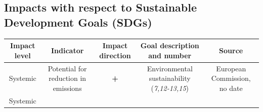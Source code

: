 \documentclass[
]{book}
\begin{document}
\hypertarget{impacts-with-respect-to-sustainable-development-goals-sdgs-22}{%
\subsection*{Impacts with respect to Sustainable Development Goals (SDGs)}\label{impacts-with-respect-to-sustainable-development-goals-sdgs-22}}

\begin{longtable}[]{@{}ccccc@{}}
\toprule
\begin{minipage}[b]{0.17\columnwidth}\centering
Impact level\strut
\end{minipage} & \begin{minipage}[b]{0.16\columnwidth}\centering
Indicator\strut
\end{minipage} & \begin{minipage}[b]{0.17\columnwidth}\centering
Impact direction\strut
\end{minipage} & \begin{minipage}[b]{0.17\columnwidth}\centering
Goal description and number\strut
\end{minipage} & \begin{minipage}[b]{0.17\columnwidth}\centering
Source\strut
\end{minipage}\tabularnewline
\midrule
\endhead
\begin{minipage}[t]{0.17\columnwidth}\centering
Systemic\strut
\end{minipage} & \begin{minipage}[t]{0.16\columnwidth}\centering
Potential for reduction in emissions\strut
\end{minipage} & \begin{minipage}[t]{0.17\columnwidth}\centering
\textbf{+}\strut
\end{minipage} & \begin{minipage}[t]{0.17\columnwidth}\centering
Environmental sustainability (\emph{7,12-13,15})\strut
\end{minipage} & \begin{minipage}[t]{0.17\columnwidth}\centering
European Commission, no date\strut
\end{minipage}\tabularnewline
\begin{minipage}[t]{0.17\columnwidth}\centering
Systemic\strut
\end{minipage} & \begin{minipage}[t]{0.16\columnwidth}\centering

\end{minipage}
\end{longtable}
\end{document}
